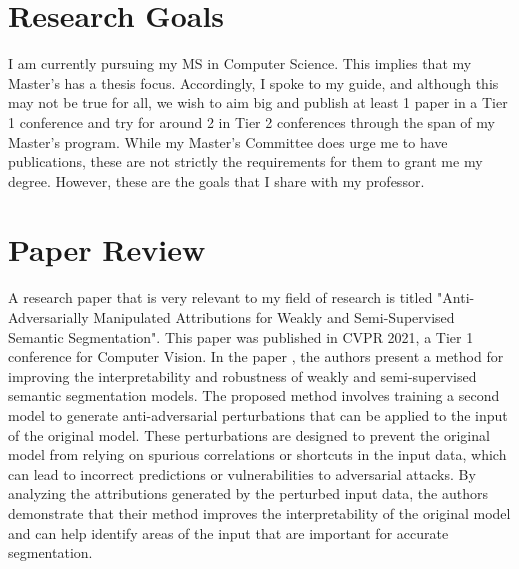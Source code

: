 \documentclass[11pt]{article}
\begin{document}
\section{Research Goals}
I am currently pursuing my MS in Computer Science. This implies that my Master's has a thesis focus. Accordingly, I spoke to my guide, and although this may not be true for all, we wish to aim big and publish at least 1 paper in a Tier 1 conference and try for around 2 in Tier 2 conferences through the span of my Master's program. While my Master's Committee does urge me to have publications, these are not strictly the requirements for them to grant me my degree. However, these are the goals that I share with my professor. 

\section{Paper Review}
A research paper that is very relevant to my field of research is titled "Anti-Adversarially Manipulated Attributions for Weakly and Semi-Supervised Semantic Segmentation". This paper was published in CVPR 2021, a Tier 1 conference for Computer Vision. \newline
In the paper \cite{lee2021anti}, the authors present a method for improving the interpretability and robustness of weakly and semi-supervised semantic segmentation models. The proposed method involves training a second model to generate anti-adversarial perturbations that can be applied to the input of the original model. These perturbations are designed to prevent the original model from relying on spurious correlations or shortcuts in the input data, which can lead to incorrect predictions or vulnerabilities to adversarial attacks. By analyzing the attributions generated by the perturbed input data, the authors demonstrate that their method improves the interpretability of the original model and can help identify areas of the input that are important for accurate segmentation. \newline
\end{document}
